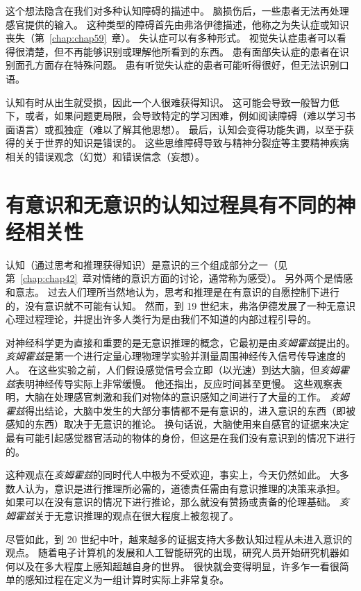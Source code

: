 这个想法隐含在我们对多种认知障碍的描述中。
脑损伤后，一些患者无法再处理感官提供的输入。
这种类型的障碍首先由弗洛伊德描述，他称之为失认症或知识丧失（第~\ref{chap:chap59}~章）。
失认症可以有多种形式。
视觉失认症患者可以看得很清楚，但不再能够识别或理解他所看到的东西。
患有面部失认症的患者在识别面孔方面存在特殊问题。
患有听觉失认症的患者可能听得很好，但无法识别口语。


认知有时从出生就受损，因此一个人很难获得知识。
这可能会导致一般智力低下，或者，如果问题更局限，会导致特定的学习困难，例如阅读障碍（难以学习书面语言）或孤独症（难以了解其他思想）。
最后，认知会变得功能失调，以至于获得的关于世界的知识是错误的。
这些思维障碍导致与精神分裂症等主要精神疾病相关的错误观念（幻觉）和错误信念（妄想）。



\section{有意识和无意识的认知过程具有不同的神经相关性}

认知（通过思考和推理获得知识）是意识的三个组成部分之一（见第~\ref{chap:chap42}~章对情绪的意识方面的讨论，通常称为感受）。
另外两个是情感和意志。
过去人们理所当然地认为，思考和推理是在有意识的自愿控制下进行的，没有意识就不可能有认知。
然而，到 19 世纪末，弗洛伊德发展了一种无意识心理过程理论，并提出许多人类行为是由我们不知道的内部过程引导的。


对神经科学更为直接和重要的是无意识推理的概念，它最初是由\textit{亥姆霍兹}提出的。
\textit{亥姆霍兹}是第一个进行定量心理物理学实验并测量周围神经传入信号传导速度的人。
在这些实验之前，人们假设感觉信号会立即（以光速）到达大脑，但\textit{亥姆霍兹}表明神经传导实际上非常缓慢。
他还指出，反应时间甚至更慢。
这些观察表明，大脑在处理感官刺激和我们对物体的意识感知之间进行了大量的工作。
\textit{亥姆霍兹}得出结论，大脑中发生的大部分事情都不是有意识的，进入意识的东西（即被感知的东西）取决于无意识的推论。
换句话说，大脑使用来自感官的证据来决定最有可能引起感觉器官活动的物体的身份，但这是在我们没有意识到的情况下进行的。


这种观点在\textit{亥姆霍兹}的同时代人中极为不受欢迎，事实上，今天仍然如此。
大多数人认为，意识是进行推理所必需的，道德责任需由有意识推理的决策来承担。
如果可以在没有意识的情况下进行推论，那么就没有赞扬或责备的伦理基础。
\textit{亥姆霍兹}关于无意识推理的观点在很大程度上被忽视了。



尽管如此，到 20 世纪中叶，越来越多的证据支持大多数认知过程从未进入意识的观点。
随着电子计算机的发展和人工智能研究的出现，研究人员开始研究机器如何以及在多大程度上感知超越自身的世界。
很快就会变得明显，许多乍一看很简单的感知过程在定义为一组计算时实际上非常复杂。


